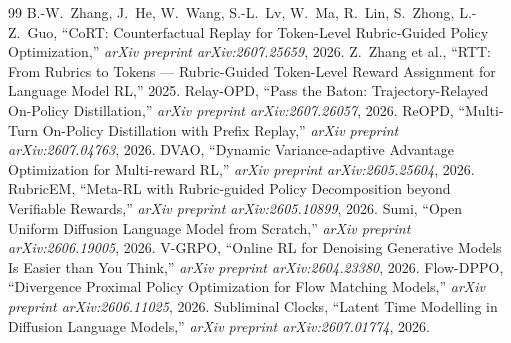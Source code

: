 \documentclass[11pt,a4paper]{article}
\begin{document}
\begin{thebibliography}{99}
 B.-W.\ Zhang, J.\ He, W.\ Wang, S.-L.\ Lv, W.\ Ma, R.\ Lin, S.\ Zhong, L.-Z.\ Guo, ``CoRT: Counterfactual Replay for Token-Level Rubric-Guided Policy Optimization,'' \emph{arXiv preprint arXiv:2607.25659}, 2026.
 Z.\ Zhang et al., ``RTT: From Rubrics to Tokens --- Rubric-Guided Token-Level Reward Assignment for Language Model RL,'' 2025.
 Relay-OPD, ``Pass the Baton: Trajectory-Relayed On-Policy Distillation,'' \emph{arXiv preprint arXiv:2607.26057}, 2026.
 ReOPD, ``Multi-Turn On-Policy Distillation with Prefix Replay,'' \emph{arXiv preprint arXiv:2607.04763}, 2026.
 DVAO, ``Dynamic Variance-adaptive Advantage Optimization for Multi-reward RL,'' \emph{arXiv preprint arXiv:2605.25604}, 2026.
 RubricEM, ``Meta-RL with Rubric-guided Policy Decomposition beyond Verifiable Rewards,'' \emph{arXiv preprint arXiv:2605.10899}, 2026.
 Sumi, ``Open Uniform Diffusion Language Model from Scratch,'' \emph{arXiv preprint arXiv:2606.19005}, 2026.
 V-GRPO, ``Online RL for Denoising Generative Models Is Easier than You Think,'' \emph{arXiv preprint arXiv:2604.23380}, 2026.
 Flow-DPPO, ``Divergence Proximal Policy Optimization for Flow Matching Models,'' \emph{arXiv preprint arXiv:2606.11025}, 2026.
 Subliminal Clocks, ``Latent Time Modelling in Diffusion Language Models,'' \emph{arXiv preprint arXiv:2607.01774}, 2026.
\end{thebibliography}
\end{document}
